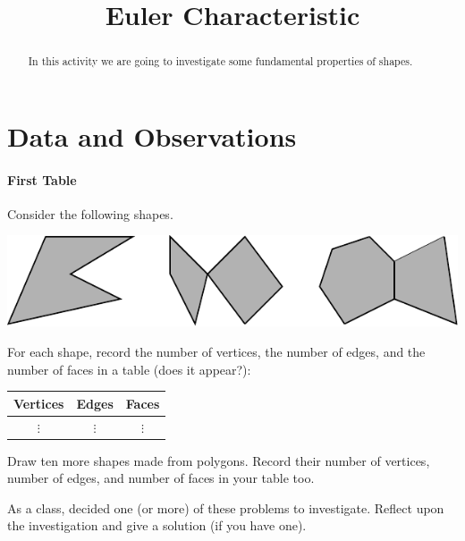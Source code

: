 \documentclass{ximera}
\title{Euler Characteristic}
\begin{document}
\begin{abstract}
In this activity we are going to investigate some fundamental
properties of shapes.
\end{abstract}
\maketitle

\section{Data and Observations}

\paragraph{First Table}

\begin{question}
Consider the following shapes.
\begin{image}
\includegraphics{eulerCharPoly.pdf}
\end{image}
For each shape, record the number of vertices, the number of edges,
and the number of faces in a table (does it appear?):
\begin{center}
\begin{tabular}{c|c|c}
Vertices & Edges & Faces\\
\hline\hline
 $\vdots$  & $\vdots$  & $\vdots$  \\ 
\end{tabular}
\end{center}
\begin{freeResponse}
\end{freeResponse}
\end{question}

\newpage

\begin{question}
Draw ten more shapes made from polygons. Record their number of
vertices, number of edges, and number of faces in your table too.
\begin{freeResponse}
\end{freeResponse}
\end{question}


\begin{problem}
As a class, decided one (or more) of these problems to
investigate. Reflect upon the investigation and give a solution (if
you have one).
\begin{freeResponse}
\end{freeResponse}
\end{problem}
\end{document}
